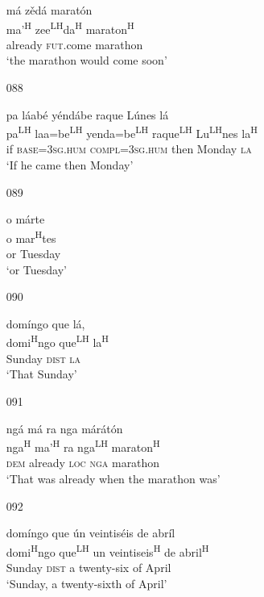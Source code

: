 \begin{itemize}
\glll   m\'{a} z\v{e}d\'{a} marat\'{o}n\\
ma'\textsuperscript{H} zee\textsuperscript{LH}da\textsuperscript{H} maraton\textsuperscript{H}\\
already \textsc{fut}.come marathon\\
\glt `the marathon would come soon'
 


\item[088]
 
\glll   pa l\'{a}ab\'{e} y\'{e}nd\'{a}be raque L\'{u}nes l\'{a}\\
pa\textsuperscript{LH} laa=be\textsuperscript{LH} yenda=be\textsuperscript{LH} raque\textsuperscript{LH} Lu\textsuperscript{LH}nes la\textsuperscript{H}\\
if \textsc{base}=\textsc{3sg.hum} \textsc{compl}=\textsc{3sg.hum} then Monday \textsc{la}\\
\glt `If he came then Monday'
 


\item[089]
 
\glll   o m\'{a}rte\\
o mar\textsuperscript{H}tes\\
or Tuesday\\
\glt `or Tuesday'
 


\item[090]
 
\glll   dom\'{i}ngo que l\'{a},\\
domi\textsuperscript{H}ngo que\textsuperscript{LH} la\textsuperscript{H}\\
Sunday \textsc{dist} \textsc{la}\\
\glt `That Sunday'
 

\item[091]
 
\glll   ng\'{a} m\'{a} ra nga m\'{a}r\'{a}t\'{o}n\\
 nga\textsuperscript{H} ma'\textsuperscript{H} ra nga\textsuperscript{LH} maraton\textsuperscript{H}\\
\textsc{dem} already \textsc{loc} \textsc{nga} marathon\\
\glt `That was already when the marathon was'
 


\item[092]
 
\glll   dom\'{i}ngo que \'{u}n veintis\'{e}is de abr\'{i}l\\
domi\textsuperscript{H}ngo que\textsuperscript{LH} un veintiseis\textsuperscript{H} de abril\textsuperscript{H}\\
Sunday \textsc{dist} a twenty-six of April\\
\glt `Sunday, a twenty-sixth of April'
 


\end{itemize}
